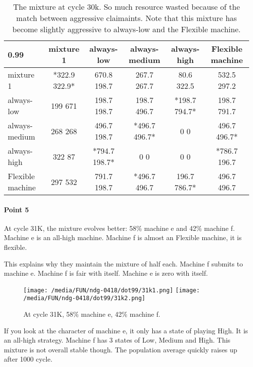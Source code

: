 \documentclass[12.5pt]{report}
\begin{document}
\begin{table}[h!]
\center
\begin{tabular}{l|ccccc}
\textbf{0.99}& mixture 1 & always-low & always-medium & always-high & Flexible machine\\
\hline

mixture 1 & *322.9 322.9* &  670.8 198.7  &  267.7 267.7 &   80.6 322.5 &     532.5 297.2 \\
always-low  &  199 671  &  198.7 198.7  &  198.7 496.7 &  *198.7 794.7* &  198.7 791.7  \\
always-medium   & 268 268  & 496.7 198.7 &  *496.7 496.7*  &     0 0   &     496.7 496.7* \\
always-high   & 322 87  & *794.7 198.7*   &    0 0     &       0 0   &    *786.7 196.7  \\
Flexible machine   & 297 532 &   791.7 198.7 &  *496.7 496.7  &  196.7 786.7*  & 496.7 496.7 \\

\end{tabular}
\caption{The mixture at cycle 30k. So much resource wasted because of the match between aggressive claimaints. Note that this mixture has become slightly aggressive to always-low and the Flexible machine.}
\end{table}

\paragraph{Point 5}

At cycle 31K, the mixture evolves better: 58\% machine e and 42\% machine f. Machine e is an all-high machine. Machine f is almost an Flexible machine, it is flexible.

This explains why they maintain the mixture of half each. Machine f submits to machine e. Machine f is fair with itself. Machine e is zero with itself.

\begin{figure}[h!]
\center
\texttt{[image: /media/FUN/ndg-0418/dot99/31k1.png]}
\texttt{[image: /media/FUN/ndg-0418/dot99/31k2.png]}
\caption{At cycle 31K, 58\% machine e, 42\% machine f.}
\end{figure}

If you look at the character of machine e, it only has a state of playing High. It is an all-high strategy. Machine f has 3 states of Low, Medium and High. This mixture is not overall stable though. The population average quickly raises up after 1000 cycle.\\
\end{document}
